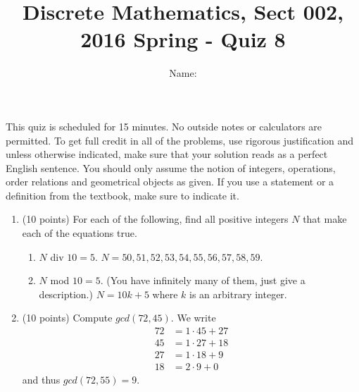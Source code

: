 \documentclass[11pt]{preprint}
\title{Discrete Mathematics, Sect 002, 2016 Spring - Quiz 8}
\author{Name:}
\institute{Courant Institute of Mathematical Sciences, NYU}
\begin{document}
\maketitle

This quiz is scheduled for 15 minutes. No outside notes or calculators are permitted. To get full credit  in all of the problems, use rigorous justification and unless otherwise indicated, make sure that your solution reads as a perfect English sentence. You should only assume the notion of integers, operations, order relations and geometrical objects as given. If you use a statement or a definition from the textbook, make sure to indicate it.
\vspace{0.2cm}

\begin{enumerate}
\item(10 points) For each of the following, find all positive integers $N$ that make each of the equations true.
\begin{enumerate}
\item $N$ div $10=5$. $N=50,51,52,53,54,55,56,57,58,59$.
\item $N$ mod $10=5$. (You have infinitely many of them, just give a description.) $N=10k+5$ where $k$ is an arbitrary integer.
\end{enumerate}
\vspace{3cm}
\item (10 points)  Compute $gcd(72,45)$.
We write
\begin{align*}
72& = 1\cdot 45+27\\
45& = 1\cdot 27+ 18\\
27& = 1\cdot 18 + 9\\
18& = 2\cdot 9 + 0
\end{align*}
and thus $gcd(72,55)=9$.
\end{enumerate}
\end{document}
